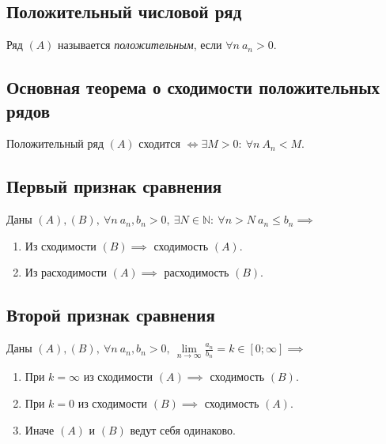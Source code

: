 \subsection{Положительный числовой ряд}

\begin{definition}
    Ряд $ (A) $ называется \emph{положительным}, если $ \forall n \ a_n>0 $.
\end{definition}

\subsection{Основная теорема о сходимости положительных рядов}

\begin{theorem}\label{theorem:2.1}
    Положительный ряд $ (A) $ сходится $ \iff \exists M > 0: \ \forall n \ A_n < M $.
\end{theorem}

\subsection{Первый признак сравнения}

\begin{theorem}\label{theorem:6.2}
    Даны $ (A),(B), \ \forall n \ a_n, b_n > 0, \ \exists N \in \mathbb{N}: \ \forall n > N \ a_n \leqslant b_n \implies $
    \begin{enumerate}
        \item Из сходимости $(B) \implies$ сходимость $(A)$.
        \item Из расходимости $(A) \implies$ расходимость $(B)$.
    \end{enumerate}
\end{theorem}

\subsection{Второй признак сравнения}

\begin{theorem}
    Даны $ (A),(B), \ \forall n \ a_n, b_n > 0, \ \underset{n\rightarrow\infty}{\lim}\frac{a_n}{b_n}=k \in [0;\infty] \implies $
    \begin{enumerate}
        \item При $k=\infty$ из сходимости $(A) \implies$ сходимость $(B)$.
        \item При $k=0$ из сходимости $(B) \implies$ сходимость $(A)$.
        \item Иначе $(A)$ и $(B)$ ведут себя одинаково.
    \end{enumerate}
\end{theorem}


